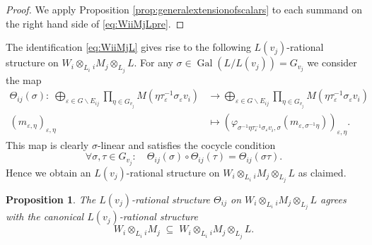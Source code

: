 \documentclass[a4paper,12pt,reqno]{amsart}
\DeclareMathOperator{\Gal}{\mathrm {Gal}}
\theoremstyle{plain}
\newtheorem{proposition}[theorem]{Proposition}
\theoremstyle{remark}
\begin{document}
    \begin{proof}
       We apply Proposition \ref{prop:generalextensionofscalars} to each summand on the right hand side of \eqref{eq:WiiMjLpre}.
    \end{proof}
    
    The identification \eqref{eq:WiiMjL} gives rise to the following $L(v_j)$-rational structure on $W_i \otimes_{L_i} {}_iM_j\otimes_{L_j}L$. For any $\sigma\in \Gal(L/L(v_j))=G_{v_j}$ we consider the map
    \begin{align*}
    \Theta_{ij}(\sigma)\colon\;
    \bigoplus_{\varepsilon\in G\backslash E_{ij}}
    \prod_{\eta\in G_{v_j}}
    M(\eta\tau_\varepsilon^{-1}\sigma_\varepsilon v_i)
    &\to
    \bigoplus_{\varepsilon\in G\backslash E_{ij}}
    \prod_{\eta\in G_{v_j}}
    M(\eta\tau_\varepsilon^{-1}\sigma_\varepsilon v_i)\\
    (m_{\varepsilon,\eta})_{\varepsilon,\eta}&\mapsto
    \left(\varphi_{\sigma^{-1}\eta\tau_\varepsilon^{-1}\sigma_\varepsilon v_i,\sigma}(m_{\varepsilon,\sigma^{-1}\eta})\right)_{\varepsilon,\eta}.
    \end{align*}
    This map is clearly $\sigma$-linear and satisfies the cocycle condition
    \[
    \forall\sigma,\tau\in G_{v_j}:\quad\Theta_{ij}(\sigma)\circ\Theta_{ij}(\tau)=\Theta_{ij}(\sigma\tau).
    \]
    Hence we obtain an $L(v_j)$-rational structure on $W_i \otimes_{L_i} {}_iM_j\otimes_{L_j}L$ as claimed.

    \begin{proposition}\label{prop:rationalstructures}
      The $L(v_j)$-rational structure $\Theta_{ij}$ on $W_i \otimes_{L_i} {}_iM_j\otimes_{L_j}L$ agrees with the canonical $L(v_j)$-rational structure
      \[
      W_i \otimes_{L_i} {}_iM_j\;\subseteq\; W_i \otimes_{L_i} {}_iM_j\otimes_{L_j}L.
      \]
    \end{proposition}
\end{document}
